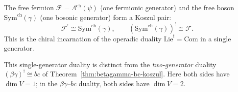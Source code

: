 \begin{theorem}\label{thm:single-fermion-boson-duality}
The free fermion $\mathcal{F} = \Lambda^{\mathrm{ch}}(\psi)$ (one fermionic generator) and the free boson $\mathrm{Sym}^{\mathrm{ch}}(\gamma)$ (one bosonic generator) form a Koszul pair:
\[\mathcal{F}^! \cong \mathrm{Sym}^{\mathrm{ch}}(\gamma), \qquad
 (\mathrm{Sym}^{\mathrm{ch}}(\gamma))^! \cong \mathcal{F}.\]
This is the chiral incarnation of the operadic duality $\mathrm{Lie}^! = \mathrm{Com}$
in a single generator.
\end{theorem}

\begin{remark}
This single-generator duality is distinct from the \emph{two-generator} duality $(\beta\gamma)^! \cong bc$ of Theorem~\ref{thm:betagamma-bc-koszul}. Here both sides have $\dim V = 1$; in the $\beta\gamma$--$bc$ duality, both sides have $\dim V = 2$.
\end{remark}

